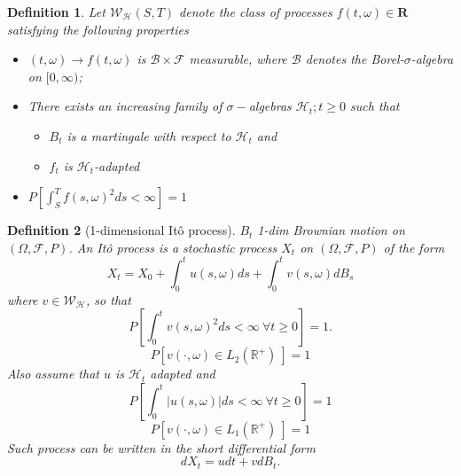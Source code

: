 \documentclass{article}
\newtheorem{definition}{Definition}
\begin{document}
\begin{definition}
    Let $\mathcal{W}_\mathcal{H}(S,T)$ denote the class of processes $f(t,\omega) \in \textbf{R}$ satisfying the following properties 
    \begin{itemize}
        \item 
            $(t,\omega) \to  f(t,\omega)$ is $\mathcal{B} \times \mathcal{F}$ measurable, where $\mathcal{B}$ denotes the Borel-$\sigma$-algebra on $[0,\infty)$;
        \item 
            There exists an increasing family of $\sigma-$algebras $\mathcal{H}_t; t\geq0$ such that
            \begin{itemize}
                \item $B_t$ is a martingale with respect to $\mathcal{H}_t$ and
                \item $f_t$ is $\mathcal{H}_t$-adapted
            \end{itemize}
        \item   
            $P\left[ \int_S^T f(s,\omega)^2ds<\infty \right] = 1$
    \end{itemize}
\end{definition}

\begin{definition}[1-dimensional Itô process]
    $B_t$ 1-dim Brownian motion on $(\Omega, \mathcal{F},P)$. An Itô process is a stochastic process $X_t$ on $(\Omega, \mathcal{F},P)$ of the form
    \begin{equation}
        X_t = X_0 + \int_0^t u(s,\omega) ds + \int_0^t v(s,\omega)dB_s
    \end{equation}
    where $v\in\mathcal{W}_\mathcal{H}$, so that 
    \begin{equation}
        P\left[ \int_0^tv(s,\omega)^2 ds < \infty \ \forall t\geq 0 \right] = 1.
    \end{equation}
    \begin{equation}
        P\left[ v(\cdot, \omega) \in L_2(\mathbb{R}^+) \ \right] =1
    \end{equation}
    Also assume that $u$ is $\mathcal{H}_t$ adapted and 
    \begin{equation}
        P\left[\int_0^t|u(s,\omega)|ds <\infty \ \forall t \geq 0  \right] = 1
    \end{equation}
    \begin{equation}
        P\left[ v(\cdot, \omega) \in L_1(\mathbb{R}^+) \ \right] =1
    \end{equation}
    Such process can be written in the short differential form
    \begin{equation}
        dX_t = udt + vdB_t.
    \end{equation}
\end{definition}
\end{document}

